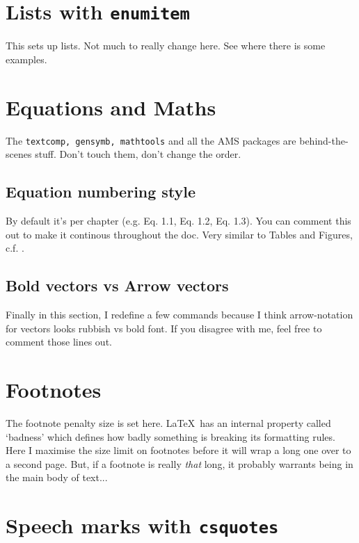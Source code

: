 \documentclass[../main]{subfiles}
\begin{document}
\section{Lists with \texttt{enumitem}}

This sets up lists. Not much to really change here. See  where there is some examples.

\section{Equations and Maths}

The \texttt{textcomp, gensymb, mathtools} and all the AMS packages are behind-the-scenes stuff. Don't touch them, don't change the order.

\subsection{Equation numbering style}\label{sub:equation_numbering}

By default it's per chapter (e.g. Eq. 1.1, Eq. 1.2, Eq. 1.3). You can comment this out to make it continous throughout the doc. Very similar to Tables and Figures, c.f. .

\subsection{Bold vectors vs Arrow vectors}

Finally in this section, I redefine a few commands because I think arrow-notation for vectors looks rubbish vs bold font. If you disagree with me, feel free to comment those lines out.


\section{Footnotes}

The footnote penalty size is set here. \LaTeX\ has an internal property called `badness' which defines how badly something is breaking its formatting rules. Here I maximise the size limit on footnotes before it will wrap a long one over to a second page. But, if a footnote is really \textit{that} long, it probably warrants being in the main body of text...

\section{Speech marks with \texttt{csquotes}}
\end{document}
